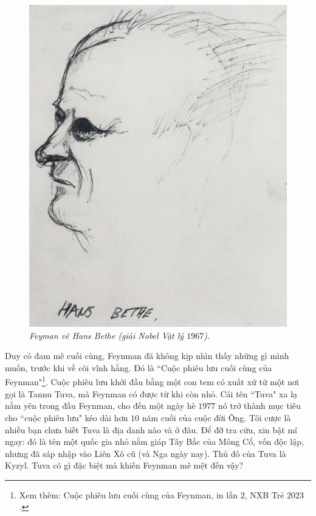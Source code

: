 \begin{multicols}{2}
	\begin{figure}[H]
		\vspace*{-5pt}
		\centering
		\captionsetup{labelformat= empty, justification=centering}
		\includegraphics[width= 1\linewidth]{3a}
		\caption{\small\textit{\color{quantoan}Feyman vẽ Hans Bethe (giải Nobel Vật lý $1967$).}}
		\vspace*{-10pt}
	\end{figure}
	Duy có đam mê cuối cùng, Feynman đã không kịp nhìn thấy những gì mình muốn, trước khi về cõi vĩnh hằng. Đó là ``Cuộc phiêu lưu cuối cùng của Feynman"\footnote[2]{\color{quantoan}Xem thêm: Cuộc phiêu lưu cuối cùng của Feynman, in lần $2$, NXB Trẻ $2023$.}. Cuộc phiêu lưu khởi đầu bằng một con tem có xuất xứ từ một nơi gọi là Tannu Tuva, mà Feynman có được từ khi còn nhỏ. Cái tên ``Tuva" xa lạ nằm yên trong đầu Feynman, cho đến một ngày hè $1977$ nó trở thành mục tiêu cho ``cuộc phiêu lưu" kéo dài hơn $10$ năm cuối của cuộc đời Ông. Tôi cược là nhiều bạn chưa biết Tuva là địa danh nào và ở đâu. Để đỡ tra cứu, xin bật mí ngay: đó là tên một quốc gia nhỏ nằm giáp Tây Bắc của Mông Cổ, vốn độc lập, nhưng đã sáp nhập vào Liên Xô cũ (và Nga ngày nay). Thủ đô của Tuva là Kyzyl. Tuva có gì đặc biệt mà khiến Feynman mê mệt đến vậy?

\end{multicols}
